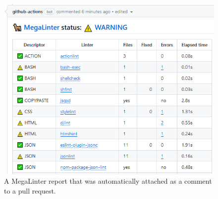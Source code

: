 \documentclass[11pt, twoside, a4paper]{report}
\begin{document}
\begin{figure}
    \centering
    \caption{\label{fig:metalinter_report}A MegaLinter report that was automatically attached as a comment to a pull request.}
    \includegraphics[width=\textwidth]{figures/megalinter_report.png}
\end{figure}



\todos{}

\end{document}
